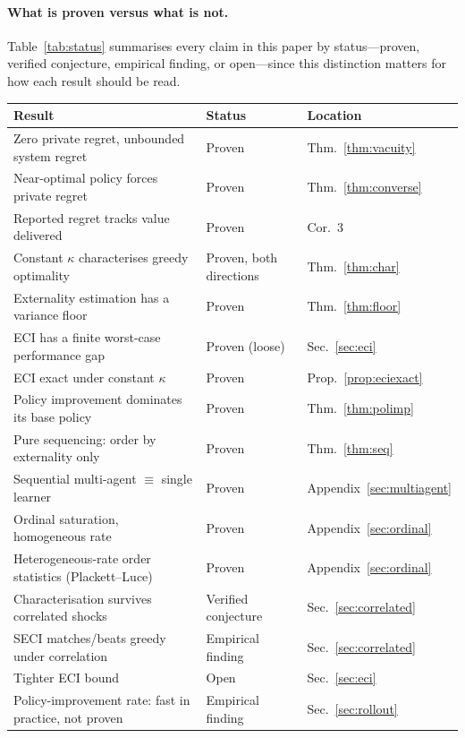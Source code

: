 \paragraph{What is proven versus what is not.} Table~\ref{tab:status}
summarises every claim in this paper by
status---proven, verified conjecture, empirical finding, or open---since this
distinction matters for how each result should be read.

\begin{table}[h]
\centering
\small
\begin{tabular}{lll}
\toprule
Result & Status & Location \\
\midrule
Zero private regret, unbounded system regret & Proven & Thm.~\ref{thm:vacuity} \\
Near-optimal policy forces private regret & Proven & Thm.~\ref{thm:converse} \\
Reported regret tracks value delivered & Proven & Cor.~3 \\
Constant $\kappa$ characterises greedy optimality & Proven, both directions & Thm.~\ref{thm:char} \\
Externality estimation has a variance floor & Proven & Thm.~\ref{thm:floor} \\
ECI has a finite worst-case performance gap & Proven (loose) & Sec.~\ref{sec:eci} \\
ECI exact under constant $\kappa$ & Proven & Prop.~\ref{prop:eciexact} \\
Policy improvement dominates its base policy & Proven & Thm.~\ref{thm:polimp} \\
Pure sequencing: order by externality only & Proven & Thm.~\ref{thm:seq} \\
Sequential multi-agent $\equiv$ single learner & Proven & Appendix~\ref{sec:multiagent} \\
Ordinal saturation, homogeneous rate & Proven & Appendix~\ref{sec:ordinal} \\
Heterogeneous-rate order statistics (Plackett--Luce) & Proven & Appendix~\ref{sec:ordinal} \\
Characterisation survives correlated shocks & Verified conjecture & Sec.~\ref{sec:correlated} \\
SECI matches/beats greedy under correlation & Empirical finding & Sec.~\ref{sec:correlated} \\
Tighter ECI bound & Open & Sec.~\ref{sec:eci} \\
Policy-improvement rate: fast in practice, not proven & Empirical finding & Sec.~\ref{sec:rollout} \\

\end{tabular}
\end{table}
